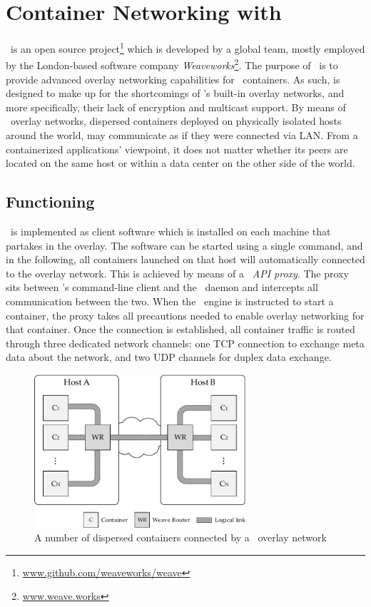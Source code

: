 
\section{Container Networking with \wnet}
\wnet\ is an open source project\footnote{\url{www.github.com/weaveworks/weave}} which is developed by a global team, mostly employed by the London-based software company \emph{Weaveworks}\footnote{\url{www.weave.works}}. The purpose of \wnet\ is to provide advanced overlay networking capabilities for \docker\ containers. As such, is designed to make up for the shortcomings of \docker 's built-in overlay networks, and more specifically, their lack of encryption and multicast support. By means of \weave\ overlay networks, dispersed containers deployed on physically isolated hosts around the world, may communicate as if they were connected via LAN. From a containerized applications' viewpoint, it does not matter whether its peers are located on the same host or within a data center on the other side of the world. 

\subsection{Functioning}
\wnet\ is implemented as client software which is installed on each machine that partakes in the overlay. The software can be started using a single command, and in the following, all containers launched on that host will automatically connected to the overlay network. This is achieved by means of a \emph{\docker\ API proxy}. The proxy sits between \docker 's command-line client and the \docker\ daemon and intercepts all communication between the two. When the \docker\ engine is instructed to start a container, the proxy takes all precautions needed to enable overlay networking for that container. Once the connection is established, all container traffic is routed through three dedicated network channels: one TCP connection to exchange meta data about the network, and two UDP channels for duplex data exchange.

\begin{figure}[htpb]
  \centering
  \includegraphics[width=0.7\textwidth]{figures/weave.pdf}
  \caption[An example of containers connected via \wnet\ overlay network]{A number of dispersed containers connected by a \wnet\ overlay network}\label{fig:weavescheme} 
\end{figure}

